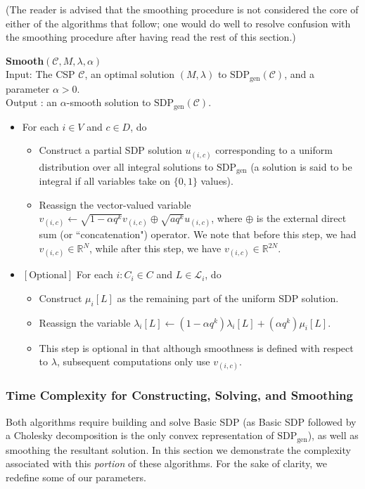 \documentclass[letterpaper, 12pt]{article}
\numberwithin{equation}{section}
\begin{document}
 (The reader is advised that the smoothing procedure is not considered the core of either of the algorithms that follow; one would do well to resolve confusion with the smoothing procedure after having read the rest of this section.)

\begin{algorithm}\textbf{Smooth$(\mathcal{C},M,\lambda, \alpha)$} \\
Input: The CSP $\mathcal{C}$, an optimal solution $(M,\lambda)$ to $\text{SDP}_{\text{gen}}(\mathcal{C})$, and a parameter $\alpha > 0$. \\
Output : an $\alpha$-smooth solution to $\text{SDP}_{\text{gen}}(\mathcal{C})$.
\begin{itemize}
\item For each $i \in V$ and $c \in D$, do
	\begin{itemize}
	\item Construct a partial SDP solution $u_{(i,c)}$ corresponding to a uniform distribution over all integral
	 solutions to
	$\text{SDP}_{\text{gen}}$ (a solution is said to be integral if all variables take on $\{0,1\}$ values).
	\item Reassign the vector-valued variable $v_{(i,c)} \leftarrow \sqrt{1-\alpha q^k} v_{(i,c)} \oplus \sqrt{aq^k}
	u_{(i,c)}$, where $\oplus$ is the external direct sum (or ``concatenation") operator. We note that before this step, we had	
	$v_{(i,c)} \in \mathbb{R}^N$, while after this step, we have $v_{(i,c)} \in \mathbb{R}^{2N}$.
	\end{itemize}
\item $\left[\text{Optional}\right]$ For each $i : C_i \in C$ and $L \in \mathcal{L}_i$, do
	\begin{itemize}
	\item  Construct $\mu_i[L]$ as the remaining part of the uniform SDP solution.
	\item Reassign the variable $\lambda_i[L] \leftarrow (1-\alpha q^k)\lambda_{i}[L] + (\alpha q^k)\mu_i[L]$. 
	\item This step is optional in that although smoothness is defined with respect to $\lambda$, subsequent
	 computations only use $v_{(i,c)}$.
	\end{itemize}
\end{itemize}
\end{algorithm}

\subsubsection{Time Complexity for Constructing, Solving, and Smoothing}\label{subsec:buildSolveSmooth}
Both algorithms require building and solve Basic SDP (as Basic SDP followed by a Cholesky decomposition is the only convex representation of $\text{SDP}_{\text{gen}}$), as well as smoothing the resultant solution. In this section we demonstrate the complexity associated with this \textit{portion} of these algorithms. For the sake of clarity, we redefine some of our parameters.
\end{document}
